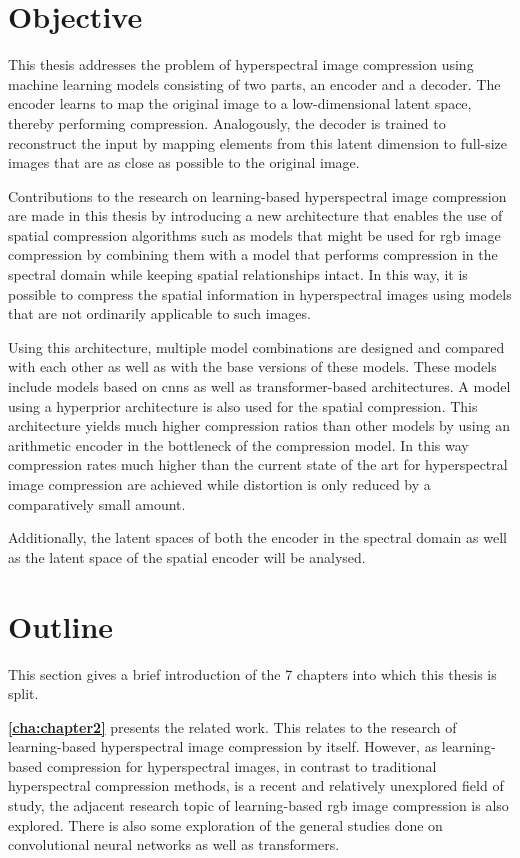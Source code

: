 \section{Objective\label{sec:objective}}
This thesis addresses the problem of hyperspectral image compression using machine learning models consisting of two parts, an encoder and a decoder.
The encoder learns to map the original image to a low-dimensional latent space, thereby performing compression. Analogously, the decoder is trained to reconstruct the input by mapping elements from this latent dimension to full-size images that are as close as possible to the original image.

Contributions to the research on learning-based hyperspectral image compression are made in this thesis by introducing a new architecture that enables the use of spatial compression algorithms such as models that might be used for \ac{rgb} image compression by combining them with a model that performs compression in the spectral domain while keeping spatial relationships intact. In this way, it is possible to compress the spatial information in hyperspectral images using models that are not ordinarily applicable to such images.

Using this architecture, multiple model combinations are designed and compared with each other as well as with the base versions of these models.
These models include models based on \acp{cnn} as well as transformer-based architectures.
A model using a hyperprior architecture is also used for the spatial compression. This architecture yields much higher compression ratios than other models by using an arithmetic encoder in the bottleneck of the compression model. In this way compression rates much higher than the current state of the art for hyperspectral image compression are achieved while distortion is only reduced by a comparatively small amount. 

Additionally, the latent spaces of both the encoder in the spectral domain as well as the latent space of the spatial encoder will be analysed.

\section{Outline\label{sec:outline}}
This section gives a brief introduction of the 7 chapters into which this thesis is split.

\textbf{\autoref{cha:chapter2}} presents the related work. This relates to the research of learning-based hyperspectral image compression by itself. However, as learning-based compression for hyperspectral images, in contrast to traditional hyperspectral compression methods, is a recent and relatively unexplored field of study, the adjacent research topic of learning-based \ac{rgb} image compression is also explored. There is also some exploration of the general studies done on convolutional neural networks as well as transformers.

